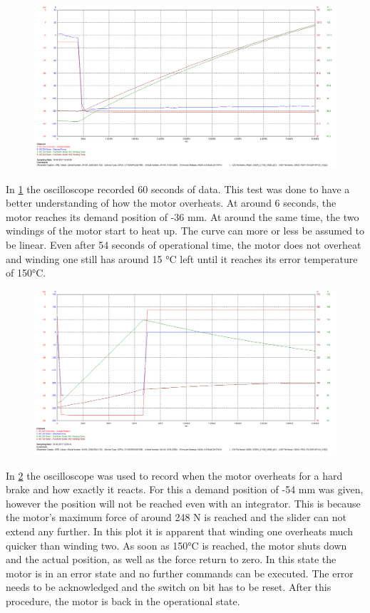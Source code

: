 \begin{figure}[h]
	\centering
	\includegraphics[width=1\linewidth]{pictures_figures/oscilloscope_neg36}
	\caption{}
	\label{fig:oscilloscopeneg36}
\end{figure}

In \cref{fig:oscilloscopeneg36} the oscilloscope recorded 60 seconds of data. This test was done to have a better understanding of how the motor overheats. At around 6 seconds, the motor reaches its demand position of -36 mm. At around the same time, the two windings of the motor start to heat up. The curve can more or less be assumed to be linear. Even after 54 seconds of operational time, the motor does not overheat and winding one still has around 15 °C left until it reaches its error temperature of 150°C. 


\begin{figure}[h]
	\centering
	\includegraphics[width=1\linewidth]{pictures_figures/oscilloscope_neg54}
	\caption{}
	\label{fig:oscilloscopeneg54}
\end{figure}

In \cref{fig:oscilloscopeneg54} the oscilloscope was used to record when the motor overheats for a hard brake and how exactly it reacts. For this a demand position of -54 mm was given, however the position will not be reached even with an integrator. This is because the motor's maximum force of around 248 N is reached and the slider can not extend any further. In this plot it is apparent that winding one overheats much quicker than winding two. As soon as 150°C is reached, the motor shuts down and the actual position, as well as the force return to zero. In this state the motor is in an error state and no further commands can be executed. The error needs to be acknowledged and the switch on bit has to be reset. After this procedure, the motor is back in the operational state.

